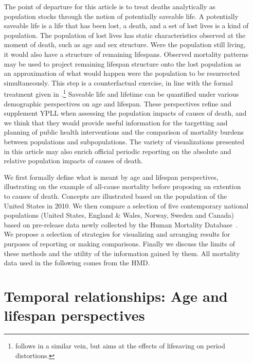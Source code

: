 \documentclass{article}
\begin{document}
The point of departure for this article is to
treat deaths analytically as population stocks through the notion of
potentially saveable life. A potentially saveable life is a life that
has been lost, a death, and a set of lost lives is a kind of population. The
population of lost lives has static characteristics observed at the moment of
death, such as age and sex structure. Were the
population still living, it would also have a structure of remaining lifespans. Observed mortality patterns may be used to project remaining
lifespan structure onto the lost population as an approximation of what would
happen were the population to be resurrected simultaneously.
This step is a counterfactual exercise, in line with the formal treatment given
in \citet{vaupel1987repeated}.\footnote{\citet{vaupel2008lifesaving} follows in
a similar vein, but aims at the effects of lifesaving on period distortions.}
Saveable life and lifetime can be quantified under various demographic
perspectives on age and lifespan. These perspectives refine and supplement YPLL when assessing the population impacts of causes of death, and we think that they would provide useful information for the targetting and planning of public health interventions and the comparison of mortality burdens between populations and subpopulations. The variety of visualizations presented in this article may also enrich official periodic reporting on the absolute and relative population impacts of causes of death.

We first formally define what is meant by age and lifespan
perspectives, illustrating on the example of all-cause
mortality before proposing an extention to causes of death. Concepts are
illustrated based on the population of the United States in 2010. We then
compare a selection of five contemporary national populations (United States, England \& Wales, Norway, Sweden and Canada) based on pre-release
data newly collected by the Human Mortality
Database~. We propose
a selection of strategies for visualizing and arranging results for purposes of
reporting or making comparisons. Finally we discuss the limits of these methods
and the utility of the information gained by them. All mortality data used in
the following comes from the HMD.

\section*{Temporal relationships: Age and lifespan perspectives}
\end{document}
